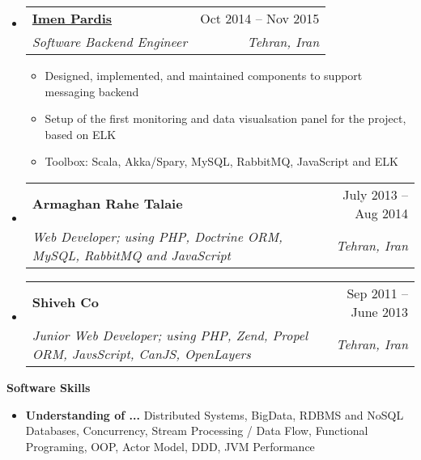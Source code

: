\documentclass[letterpaper,12pt]{article}[leftmargin=*]
\makeatletter
\def \entryspacing {-0pt}
\renewcommand{\section}[2]{\vspace{5pt}
  \colorbox{secondary}{\color{white}\raggedbottom\normalsize\textbf{{#1}{\hspace{7pt}#2}}}
}
\newcommand{\resumeEntryStart}{\begin{itemize}[leftmargin=2.5mm]}
\newcommand{\resumeEntryEnd}{\end{itemize}\vspace{\entryspacing}}
\newcommand{\resumeItemListStart}{\begin{itemize}[leftmargin=4.5mm]}
\newcommand{\resumeItemListEnd}{\end{itemize}}
\newcommand{\resumeItem}[1]{
  \item\small{
    {#1 \vspace{-2pt}}
  }
}
\newcommand{\resumeEntryTSDL}[4]{
  \vspace{-1pt}\item[]
    \begin{tabular*}{0.97\textwidth}{l@{\extracolsep{\fill}}r}
      \textbf{\color{primary}#1} & {\firabook\color{accent}\small#2} \\
      \textit{\color{accent}\small#3} & \textit{\color{accent}\small#4} \\
    \end{tabular*}\vspace{-6pt}
}
\newcommand{\resumeEntryS}[2]{
  \item[]\small{
    \textbf{\color{primary}#1 }{ #2 \vspace{-6pt}}
  }
}
\makeatother
\begin{document}

  \resumeEntryStart
    \resumeEntryTSDL
	  {\href{https://imenpardis.com/fa/}{Imen Pardis}}{Oct 2014 -- Nov 2015}
      {Software Backend Engineer}{Tehran, Iran}
    \resumeItemListStart
        \resumeItem {Designed, implemented, and maintained components to support messaging backend}
        \resumeItem {Setup of the first monitoring and data visualsation panel for the project, based on ELK}
        \resumeItem{Toolbox: Scala, Akka/Spary, MySQL, RabbitMQ, JavaScript and ELK}
    \resumeItemListEnd
  \resumeEntryEnd

\vspace{-13pt} %

  \resumeEntryStart
    \resumeEntryTSDL
      {Armaghan Rahe Talaie}{July 2013 -- Aug 2014}
      {Web Developer; using PHP, Doctrine ORM, MySQL, RabbitMQ and JavaScript}{Tehran, Iran}
  \resumeEntryEnd

\vspace{-13pt} %

  \resumeEntryStart
    \resumeEntryTSDL
      {Shiveh Co}{Sep 2011 -- June 2013}
      {Junior Web Developer; using PHP, Zend, Propel ORM, JavsScript, CanJS, OpenLayers}{Tehran, Iran}
  \resumeEntryEnd

\section{\faPuzzlePiece}{Software Skills}
  \resumeEntryStart
  \resumeEntryS{Understanding of ... } {Distributed Systems, BigData, RDBMS and NoSQL Databases, Concurrency, Stream Processing / Data Flow, Functional Programing, OOP, Actor Model, DDD, JVM Performance}
  \resumeEntryEnd
\end{document}
